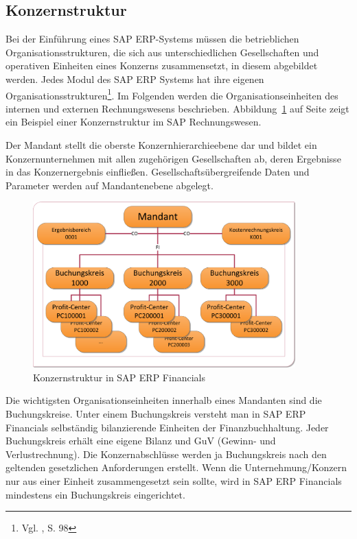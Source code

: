 \subsection{Konzernstruktur}
Bei der Einführung eines SAP ERP-Systems müssen die betrieblichen Organisationsstrukturen, die sich aus unterschiedlichen Gesellschaften und operativen Einheiten eines Konzerns zusammensetzt, in diesem abgebildet werden.
Jedes Modul des SAP ERP Systems hat ihre eigenen Organisationsstrukturen\footnote{Vgl. \cite{Klein2010}, S. 98}. Im Folgenden werden die Organisationseinheiten des internen und externen Rechnungswesens beschrieben. Abbildung~\ref{abb2} auf Seite \pageref{abb2} zeigt ein Beispiel einer Konzernstruktur im SAP Rechnungswesen.

Der Mandant stellt die oberste Konzernhierarchieebene dar und bildet ein Konzernunternehmen mit allen zugehörigen Gesellschaften ab, deren Ergebnisse in das Konzernergebnis einfließen. Gesellschaftsübergreifende Daten und Parameter werden auf Mandantenebene abgelegt.
\begin{figure}[htbp]
\begin{center}
\includegraphics[width=0.9\textwidth]{Images/konzernStruktur.png}

   \caption[Konzernstruktur in SAP ERP Financials]{Konzernstruktur in SAP ERP Financials}\label{abb2}
\end{center}
\end{figure}\noindent
Die wichtigsten Organisationseinheiten innerhalb eines Mandanten sind die Buchungskreise. Unter einem Buchungskreis versteht man in SAP ERP Financials selbständig bilanzierende Einheiten der Finanzbuchhaltung. Jeder Buchungskreis erhält eine eigene Bilanz und GuV (Gewinn- und Verlustrechnung). Die Konzernabschlüsse werden ja Buchungskreis nach den geltenden gesetzlichen Anforderungen erstellt. Wenn die Unternehmung/Konzern nur aus einer Einheit zusammengesetzt sein sollte, wird in SAP ERP Financials mindestens ein Buchungskreis eingerichtet.

